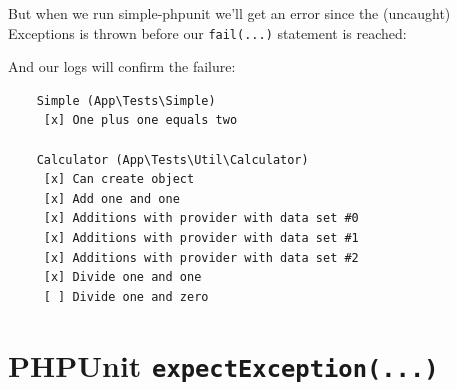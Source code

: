 \documentclass[a4paperpaper,openright]{book}
\newenvironment{Shaded}{}{}
\newcommand{\ExtensionTok}[1]{#1}
\newcommand{\NormalTok}[1]{#1}
\begin{document}
But when we run simple-phpunit we'll get an error since the (uncaught)
Exceptions is thrown before our \texttt{fail(...)} statement is reached:

\begin{Shaded}
\end{Shaded}

And our logs will confirm the failure:

\begin{verbatim}
    Simple (App\Tests\Simple)
     [x] One plus one equals two

    Calculator (App\Tests\Util\Calculator)
     [x] Can create object
     [x] Add one and one
     [x] Additions with provider with data set #0
     [x] Additions with provider with data set #1
     [x] Additions with provider with data set #2
     [x] Divide one and one
     [ ] Divide one and zero
\end{verbatim}

\hypertarget{phpunit-expectexception...}{%
\section{\texorpdfstring{PHPUnit
\texttt{expectException(...)}}{PHPUnit expectException(...)}}\label{phpunit-expectexception...}}
\end{document}
